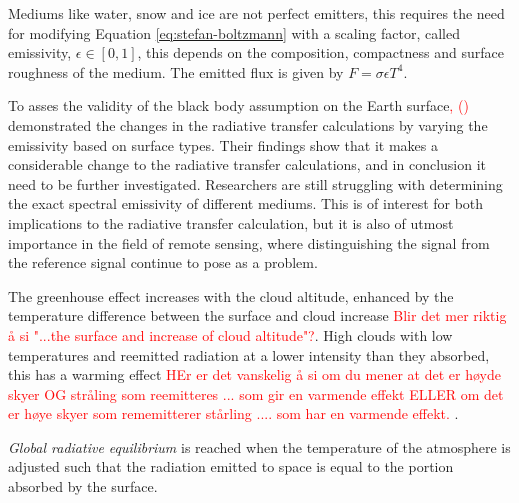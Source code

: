 Mediums like water, snow and ice are not perfect emitters, this requires the need for modifying Equation \eqref{eq:stefan-boltzmann} with a scaling factor, called emissivity, $\epsilon \in [0, 1]$, this depends on the composition, compactness and surface roughness of the medium. The emitted flux is given by $ F = \sigma \epsilon T ^4$. 

    To asses the validity of the black body assumption on the Earth surface\textcolor{red}{,} \citeauthor{Huang2018ImprovedClimate} \textcolor{red}{(\citeyear{Huang2018ImprovedClimate})} demonstrated the changes in the radiative transfer calculations by varying the emissivity based on surface types. Their findings show that it makes a considerable change to the radiative transfer calculations, and in conclusion it need to be further investigated. Researchers are still struggling with determining the exact spectral emissivity of different mediums. This is of interest for both implications to the radiative transfer calculation, but it is also of utmost importance in the field of remote sensing, where distinguishing the signal from the reference signal continue to pose as a problem.

The greenhouse effect increases with the cloud altitude, enhanced by the temperature difference between the surface and cloud increase \textcolor{red}{Blir det mer riktig å si "...the surface and increase of cloud altitude"?}. High clouds with low temperatures and reemitted radiation at a lower intensity than they absorbed, this has a warming effect \textcolor{red}{HEr er det vanskelig å si om du mener at det er høyde skyer OG stråling som reemitteres ... som gir en varmende effekt ELLER om det er høye skyer som rememitterer stårling .... som har en varmende effekt. }. 

\textit{Global radiative equilibrium} is reached when the temperature of the atmosphere is adjusted such that the radiation emitted to space is equal to the portion absorbed by the surface.



